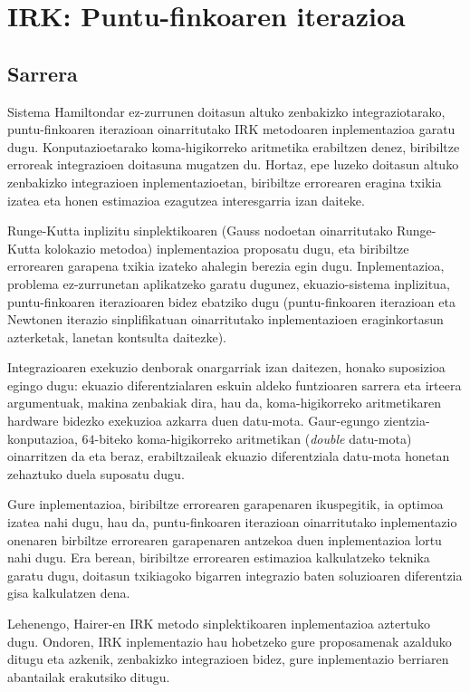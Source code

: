 \chapter{IRK: Puntu-finkoaren iterazioa}
\label{chap:IRK-PF}

\section{Sarrera}


Sistema Hamiltondar ez-zurrunen doitasun altuko zenbakizko integraziotarako, puntu-finkoaren iterazioan oinarritutako IRK metodoaren inplementazioa garatu dugu. Konputazioetarako koma-higikorreko aritmetika erabiltzen denez, biribiltze erroreak integrazioen doitasuna mugatzen du. Hortaz, epe luzeko doitasun altuko zenbakizko integrazioen inplementazioetan, biribiltze errorearen eragina txikia izatea eta honen estimazioa ezagutzea interesgarria izan daiteke. 

Runge-Kutta inplizitu sinplektikoaren (Gauss nodoetan oinarritutako Runge-Kutta kolokazio metodoa) inplementazioa proposatu dugu, eta biribiltze errorearen garapena txikia izateko ahalegin berezia egin dugu. Inplementazioa, problema ez-zurrunetan aplikatzeko garatu dugunez, ekuazio-sistema inplizitua, puntu-finkoaren iterazioaren bidez ebatziko dugu (puntu-finkoaren iterazioan eta Newtonen iterazio sinplifikatuan oinarritutako inplementazioen eraginkortasun azterketak, \cite{Hairer2006,JMSanz-Serna1994} lanetan kontsulta daitezke).

Integrazioaren exekuzio denborak onargarriak izan daitezen, honako suposizioa egingo dugu: ekuazio diferentzialaren eskuin aldeko funtzioaren sarrera eta irteera argumentuak, makina zenbakiak dira, hau da, koma-higikorreko aritmetikaren hardware bidezko exekuzioa azkarra duen datu-mota. Gaur-egungo zientzia-konputazioa,  $64$-biteko koma-higikorreko aritmetikan (\emph{double} datu-mota) oinarritzen da eta beraz, erabiltzaileak ekuazio diferentziala datu-mota honetan zehaztuko duela suposatu dugu.

Gure inplementazioa, biribiltze errorearen garapenaren ikuspegitik, ia optimoa izatea nahi dugu, hau da, puntu-finkoaren iterazioan oinarritutako inplementazio onenaren birbiltze errorearen garapenaren antzekoa duen inplementazioa lortu nahi dugu. Era berean, biribiltze errorearen estimazioa kalkulatzeko teknika garatu dugu, doitasun txikiagoko bigarren integrazio baten soluzioaren diferentzia gisa kalkulatzen dena. 
 
 
Lehenengo, Hairer-en IRK metodo sinplektikoaren inplementazioa  \cite{Hairer2008} aztertuko dugu. Ondoren, IRK inplementazio hau hobetzeko gure proposamenak azalduko ditugu eta azkenik, zenbakizko integrazioen bidez, gure inplementazio berriaren abantailak erakutsiko ditugu.


